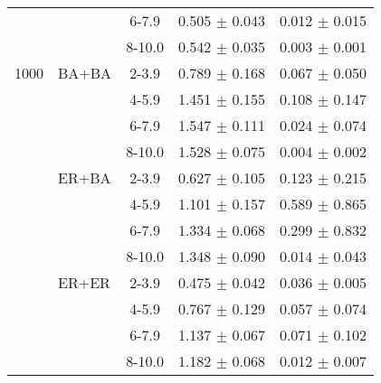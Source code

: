 \begin{table*}[htbp]
{\begin{tabular}{l l c c c}
 &  & 6-7.9 & 0.505 $\pm$ 0.043 & 0.012 $\pm$ 0.015 \\
 &  & 8-10.0 & 0.542 $\pm$ 0.035 & 0.003 $\pm$ 0.001 \\
\midrule\midrule
1000 & BA+BA & 2-3.9 & 0.789 $\pm$ 0.168 & 0.067 $\pm$ 0.050 \\
 &  & 4-5.9 & 1.451 $\pm$ 0.155 & 0.108 $\pm$ 0.147 \\
 &  & 6-7.9 & 1.547 $\pm$ 0.111 & 0.024 $\pm$ 0.074 \\
 &  & 8-10.0 & 1.528 $\pm$ 0.075 & 0.004 $\pm$ 0.002 \\
\midrule
 & ER+BA & 2-3.9 & 0.627 $\pm$ 0.105 & 0.123 $\pm$ 0.215 \\
 &  & 4-5.9 & 1.101 $\pm$ 0.157 & 0.589 $\pm$ 0.865 \\
 &  & 6-7.9 & 1.334 $\pm$ 0.068 & 0.299 $\pm$ 0.832 \\
 &  & 8-10.0 & 1.348 $\pm$ 0.090 & 0.014 $\pm$ 0.043 \\
\midrule
 & ER+ER & 2-3.9 & 0.475 $\pm$ 0.042 & 0.036 $\pm$ 0.005 \\
 &  & 4-5.9 & 0.767 $\pm$ 0.129 & 0.057 $\pm$ 0.074 \\
 &  & 6-7.9 & 1.137 $\pm$ 0.067 & 0.071 $\pm$ 0.102 \\
 &  & 8-10.0 & 1.182 $\pm$ 0.068 & 0.012 $\pm$ 0.007 \\
\bottomrule
\end{tabular}%
}
\end{table*}
